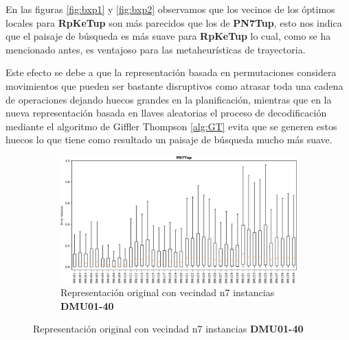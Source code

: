 En las figuras \ref{fig:bxp1} y \ref{fig:bxp2} observamos que los vecinos de los óptimos locales para \textbf{RpKeTup} son más parecidos que los de \textbf{PN7Tup}, esto nos indica que el paisaje de búsqueda es más suave para \textbf{RpKeTup} lo cual, como se ha mencionado antes, es ventajoso para las metaheurísticas de trayectoria.  

Este efecto se debe a que la representación basada en permutaciones considera movimientos que pueden ser bastante disruptivos como atrasar toda una cadena de operaciones dejando huecos grandes en la planificación, mientras que en la nueva representación basada en llaves aleatorias el proceso de decodificación mediante el algoritmo de Giffler Thompson \ref{alg:GT} evita que se generen estos huecos lo que tiene como resultado un paisaje de búsqueda mucho más suave.
\begin{figure}[hbtp]
    \begin{subfigure}{\textwidth}
        \centering
        \includegraphics[scale=.6]{Imagenes/bxpn7_1.png}
        \caption{Representación original con vecindad n7 instancias \textbf{DMU01-40}}
    \end{subfigure}
\end{figure}
